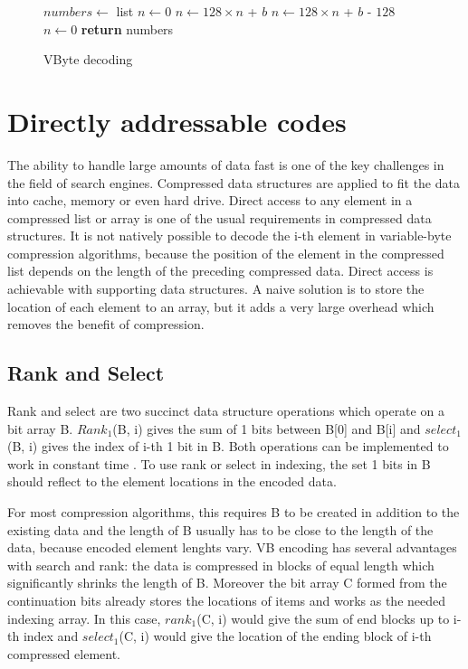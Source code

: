 \begin{figure}[ht]
\centering
  \begin{minipage}{0.5\linewidth}
\begin{algorithmic}[H]
\State $numbers\gets $ list
\State $n\gets 0$
\State $n\gets 128\times n $ + $b$
\Else
\State $n\gets 128\times n $ + $b$ - $128$
\State {}
\State $n\gets 0$
\EndIf
\EndFor
\State \textbf{return} numbers
\EndFunction
\end{algorithmic}
\end{minipage}
\caption{VByte decoding} \label{vbyte_dec}
\end{figure}



\chapter{Directly addressable codes} \label{chapter:DAC}

The ability to handle large amounts of data fast is one of the key challenges in the field of search engines. Compressed data structures are applied to fit the 
data into cache, memory or even hard drive. Direct access to any element in a compressed list or array is one of the usual requirements in compressed data 
structures. It is not natively possible to decode the i-th element in variable-byte compression algorithms, because the position of the element in the compressed
list depends on the length of the preceding compressed data. Direct access is achievable with supporting data structures. A naive solution is to store the location 
of each element to an array, but it adds a very large overhead which removes the benefit of compression.

\section{Rank and Select}
Rank and select are two succinct data structure operations which operate on a bit array B. $Rank_1$(B, i) gives the sum of 1 bits between B[0] and B[i] and 
$select_1$(B, i) gives the index of i-th 1 bit in B. Both operations can be implemented to work in constant time \citep{gbmp2014sea}. To use rank or select in indexing, the
set 1 bits in B should reflect to the element locations in the encoded data. 

For most compression algorithms, this requires B to be created in addition to the existing data and the length of B usually 
has to be close to the length of the data, because encoded element lenghts vary. VB encoding has several advantages with search and rank: the data is compressed in 
blocks of equal length which significantly shrinks the length of B. Moreover the bit array C formed from the continuation bits already stores the locations of items and works
as the needed indexing array. In this case, $rank_1$(C, i) would give the sum of end blocks up to i-th index and $select_1$(C, i) would give the location of the ending block 
of i-th compressed element.

